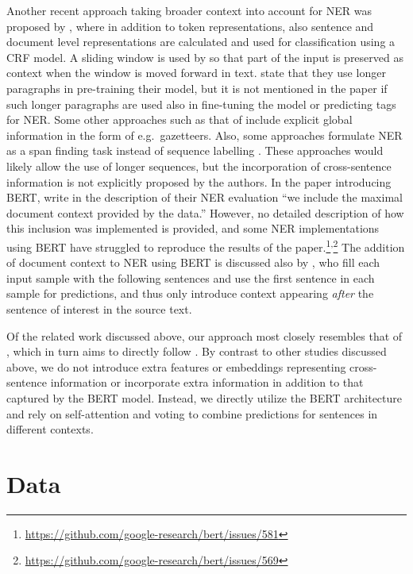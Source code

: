 \documentclass[11pt]{article}
\begin{document}
Another recent approach taking broader context into account for NER was proposed by , where in addition to token representations, also sentence and document level representations are calculated and used for classification using a CRF model. A sliding window is used by  so that part of the input is preserved as context when the window is moved forward in text. 
 state that they use longer paragraphs in pre-training their model, but it is not mentioned in the paper if such longer paragraphs are used also in fine-tuning the model or predicting tags for NER.
Some other approaches such as that of  include explicit global information in the form of e.g.\ gazetteers. Also, some approaches formulate NER as a span finding task instead of sequence labelling \cite{banerjee2019knowledge,li-etal-2020-unified}. These approaches would likely allow the use of longer sequences, but the incorporation of cross-sentence information is not explicitly proposed by the authors. In the paper introducing BERT,  write in the description of their NER evaluation ``we include the maximal document context provided by the data.'' However, no detailed description of how this inclusion was implemented is provided, and some NER implementations using BERT have struggled to reproduce the results of the paper.\footnote{\url{https://github.com/google-research/bert/issues/581}}\textsuperscript{,}\footnote{\url{ https://github.com/google-research/bert/issues/569}} 
The addition of document context to NER using BERT is discussed also by , who fill each input sample with the following sentences and use the first sentence in each sample for predictions, and thus only introduce context appearing \emph{after} the sentence of interest in the source text.

Of the related work discussed above, our approach most closely resembles that of , which in turn aims to directly follow .
By contrast to other studies discussed above, we do not introduce extra features or embeddings representing cross-sentence information or incorporate extra information in addition to that captured by the BERT model. Instead, we directly utilize the BERT architecture and rely on self-attention and voting to combine predictions for sentences in different contexts. 


\section{Data}
\end{document}
